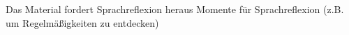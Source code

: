 Das Material fordert Sprachreflexion heraus
Momente für Sprachreflexion (z.B. um Regelmäßigkeiten zu entdecken)